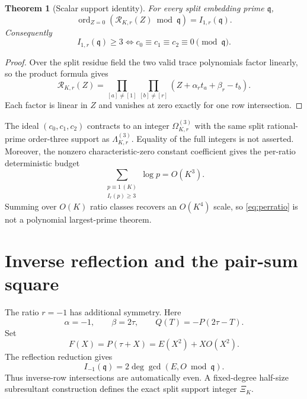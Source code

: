 \documentclass[11pt]{article}
\newtheorem{theorem}{Theorem}[section]
\newcommand{\ord}{\operatorname{ord}}
\begin{document}
\begin{theorem}[Scalar support identity]\label{thm:scalar-support}
For every split embedding prime $\mathfrak q$,
\begin{equation}\label{eq:ordshift}
\ord_{Z=0}(\mathcal R_{K,r}(Z)\bmod\mathfrak q)
 =I_{1,r}(\mathfrak q).
\end{equation}
Consequently
\[
I_{1,r}(\mathfrak q)\ge3
\iff
c_0\equiv c_1\equiv c_2\equiv0\pmod{\mathfrak q}.
\]
\end{theorem}

\begin{proof}
Over the split residue field the two valid trace polynomials factor linearly,
so the product formula gives
\[
\mathcal R_{K,r}(Z)
 =\prod_{[a]\ne[1]}\prod_{[b]\ne[r]}
   (Z+\alpha_rt_a+\beta_r-t_b).
\]
Each factor is linear in $Z$ and vanishes at zero exactly for one row
intersection.
\end{proof}

The ideal $(c_0,c_1,c_2)$ contracts to an integer
$\Omega_{K,r}^{(3)}$ with the same split rational-prime order-three support as
$\Lambda_{K,r}^{(3)}$.  Equality of the full integers is not asserted.
Moreover, the nonzero characteristic-zero constant coefficient gives the
per-ratio deterministic budget
\begin{equation}\label{eq:perratio}
\sum_{\substack{p\equiv1\,(K)\\I_r(p)\ge3}}\log p=O(K^3).
\end{equation}
Summing over $O(K)$ ratio classes recovers an $O(K^4)$ scale, so
\eqref{eq:perratio} is not a polynomial largest-prime theorem.

\section{Inverse reflection and the pair-sum square}

The ratio $r=-1$ has additional symmetry.  Here
\[
\alpha=-1,\qquad \beta=2\tau,
\qquad Q(T)=-P(2\tau-T).
\]
Set
\begin{equation}\label{eq:FEO}
F(X)=P(\tau+X)=E(X^2)+XO(X^2).
\end{equation}
The reflection reduction gives
\begin{equation}\label{eq:inverse-gcd}
I_{-1}(\mathfrak q)=2\deg\gcd(E,O\bmod\mathfrak q).
\end{equation}
Thus inverse-row intersections are automatically even.  A fixed-degree
half-size subresultant construction defines the exact split support integer
$\Xi_K$.
\end{document}
